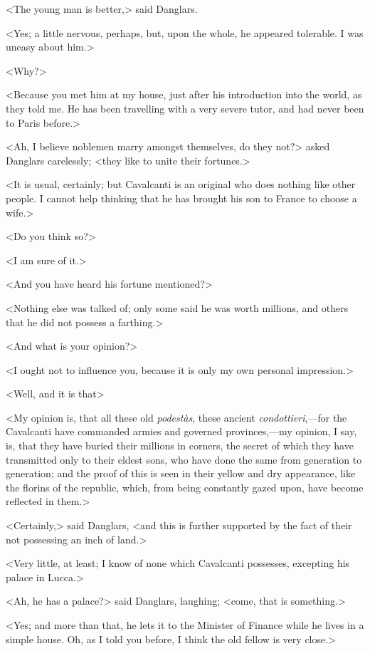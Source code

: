  <The young man is better,> said Danglars. 

 <Yes; a little nervous, perhaps, but, upon the whole, he appeared tolerable. I was uneasy about him.> 

 <Why?> 

 <Because you met him at my house, just after his introduction into the world, as they told me. He has been travelling with a very severe tutor, and had never been to Paris before.> 

 <Ah, I believe noblemen marry amongst themselves, do they not?> asked Danglars carelessly; <they like to unite their fortunes.> 

 <It is usual, certainly; but Cavalcanti is an original who does nothing like other people. I cannot help thinking that he has brought his son to France to choose a wife.> 

 <Do you think so?> 

 <I am sure of it.> 

 <And you have heard his fortune mentioned?> 

 <Nothing else was talked of; only some said he was worth millions, and others that he did not possess a farthing.> 

 <And what is your opinion?> 

 <I ought not to influence you, because it is only my own personal impression.> 

 <Well, and it is that\longdash> 

 <My opinion is, that all these old \textit{podestàs}, these ancient \textit{condottieri},—for the Cavalcanti have commanded armies and governed provinces,—my opinion, I say, is, that they have buried their millions in corners, the secret of which they have transmitted only to their eldest sons, who have done the same from generation to generation; and the proof of this is seen in their yellow and dry appearance, like the florins of the republic, which, from being constantly gazed upon, have become reflected in them.> 

 <Certainly,> said Danglars, <and this is further supported by the fact of their not possessing an inch of land.> 

 <Very little, at least; I know of none which Cavalcanti possesses, excepting his palace in Lucca.> 

 <Ah, he has a palace?> said Danglars, laughing; <come, that is something.> 

 <Yes; and more than that, he lets it to the Minister of Finance while he lives in a simple house. Oh, as I told you before, I think the old fellow is very close.> 

